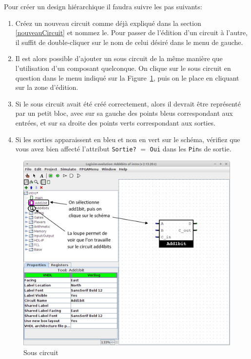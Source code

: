\documentclass{article}
\begin{document}
    Pour créer un design hiérarchique il faudra suivre les pas
    suivants:
    \begin{enumerate}
        \item Créez un nouveau circuit comme déjà expliqué dans la section \ref{nouveauCircuit} et nommez le.
        Pour passer de l'édition d'un circuit à l'autre, il suffit de double-cliquer sur le nom de celui désiré dans le menu de
        gauche.
        \item Il est alors possible d'ajouter un sous circuit de la même manière que l'utilisation d'un
        composant quelconque.
        On clique sur le sous circuit en question dans le menu indiqué sur la Figure~\ref{fig_sousCircuit}, puis on le
        place en cliquant sur la zone d'édition.
        \item Si le sous circuit avait été créé correctement, alors il devrait être représenté par un petit bloc, avec
        sur sa gauche des points bleus correspondant aux entrées, et sur sa droite des points verts correspondant aux sorties.
        \item Si les sorties apparaissent en bleu et non en vert sur le schéma, vérifiez que vous avez bien affecté l'attribut
        \texttt{Sortie?} $=$ \texttt{Oui} dans les \texttt{Pin}s de sortie.

    \end{enumerate}

    \begin{figure}[H]
        \begin{center}
            \includegraphics[width=450pt]{pictures/logisim_sousCircuit.png}
            \caption{\label{fig_sousCircuit}Sous circuit}
        \end{center}
    \end{figure}
\end{document}
